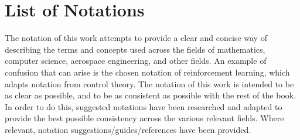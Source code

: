 \setlength{\glsdescwidth}{0.8\textwidth}

\chapter{List of Notations}

The notation of this work attempts to provide a clear and concise way of describing the terms and concepts used across the fields of mathematics, computer science, aerospace engineering, and other fields. An example of confusion that can arise is the chosen notation of reinforcement learning, which adapts notation from control theory. The notation of this work is intended to be as clear as possible, and to be as consistent as possible with the rest of the book. In order to do this, suggested notations have been researched and adapted to provide the best possible consistency across the various relevant fields. Where relevant, notation suggestions/guides/references have been provided.


\printnoidxglossary[
    type={notation:np},
    title={Numbers \& Arrays},
    nonumberlist
]

\printnoidxglossary[
    type={notation:ix},
    title={Indexing},
    nonumberlist
]

\printnoidxglossary[
    type={notation:om},
    title={Orbital Mechanics},
    nonumberlist
]
\printnoidxglossary[
    type={notation:mission},
    title={Other},
    nonumberlist
]
\printnoidxglossary[
    type={notation:set},
    title={Sets \& Graphs},
    nonumberlist
]
\printnoidxglossary[
    type={notation:fn},
    title={Functions},
    nonumberlist
]
\printnoidxglossary[
    type={notation:ml},
    title={Machine Learning},
    nonumberlist
]
\printnoidxglossary[
    type={notation:dl},
    title={Deep Learning},
    nonumberlist
]
\printnoidxglossary[
    type={notation:rl},
    title={Reinforcement Learning},
    nonumberlist
]
\printnoidxglossary[
    type={notation:prob},
    title={Probability and information theory},
]
